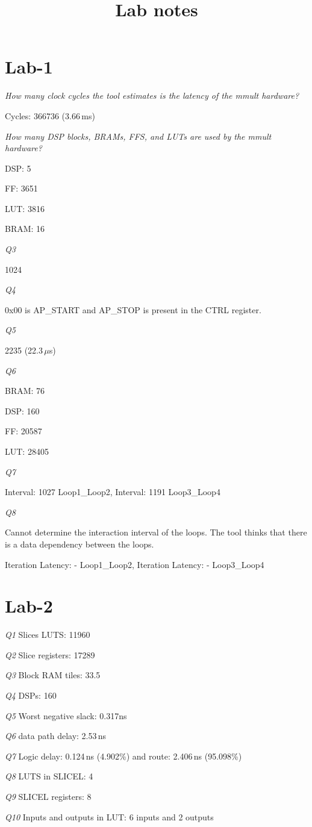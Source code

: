 \documentclass{article}
\title{Lab notes}
\begin{document}
\maketitle

\section{Lab-1}

\emph{How many clock cycles the tool estimates is the latency of the mmult hardware?}

Cycles: 366736 (3.66\,ms)



\noindent \emph{How many DSP blocks, BRAMs, FFS, and LUTs are used by the mmult hardware?}

DSP: 5

FF: 3651

LUT: 3816

BRAM: 16



\noindent  \emph{Q3}

1024

\noindent  \emph{Q4}

0x00 is \textsf{AP\_START} and \textsf{AP\_STOP} is present in the \textsf{CTRL} register.

\noindent \emph{Q5}

2235 (22.3\,$\mu$s)


\noindent \emph{Q6}

BRAM: 76

DSP: 160

FF: 20587

LUT: 28405


\noindent \emph{Q7}

Interval: 1027 \textsf{Loop1\_Loop2}, Interval: 1191 \textsf{Loop3\_Loop4}


\noindent \emph{Q8}

Cannot determine the interaction interval of the loops. The tool thinks that there is a data dependency between the loops. 

Iteration Latency: - \textsf{Loop1\_Loop2}, Iteration Latency: - \textsf{Loop3\_Loop4}

\newpage

\section{Lab-2} 

\emph{Q1} Slices LUTS: 11960

\emph{Q2} Slice registers: 17289

\emph{Q3} Block RAM tiles: 33.5

\emph{Q4} DSPs: 160

\emph{Q5} Worst negative slack: 0.317ns

\emph{Q6} data path delay: 2.53\,ns 

\emph{Q7} Logic delay: 0.124\,ns (4.902\%) and route: 2.406\,ns (95.098\%)

\emph{Q8} LUTS in SLICEL: 4

\emph{Q9} SLICEL registers: 8

\emph{Q10} Inputs and outputs in LUT: 6 inputs and 2 outputs 
\end{document}
